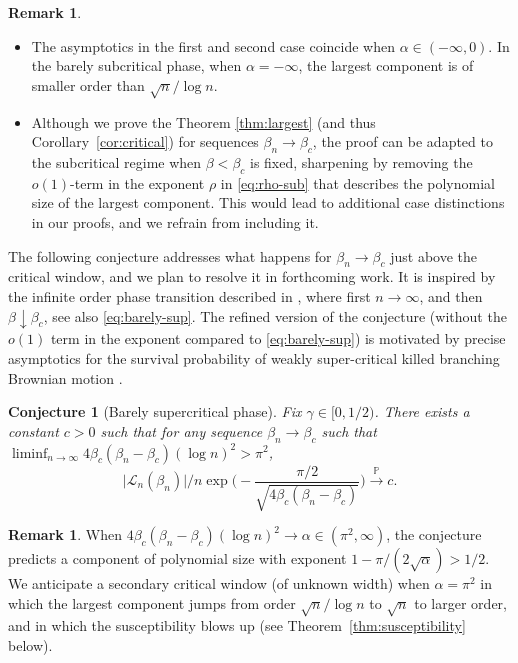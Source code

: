\documentclass[a4paper, a4wide, 10pt, reqno]{amsart}
\theoremstyle{plain}
\newtheorem{conjecture}[theorem]{Conjecture}
\theoremstyle{definition}
\newtheorem{remark}[theorem]{Remark}
\numberwithin{equation}{section}
\newcommand{\Prob}{\mathbb{P}}
\newcommand{\sL}{{\mathscr L}}
\begin{document}
\begin{remark}\ \\[-3mm]
\begin{itemize}[leftmargin=18pt]
    \item[(i)] The asymptotics in the first and second case coincide when $\alpha\in(-\infty, 0)$. In the barely subcritical phase, when $\alpha=-\infty$, the largest component is of smaller order than $\sqrt{n}/\log n$. 
    \item[(ii)]
    Although we prove the Theorem \ref{thm:largest} (and thus Corollary~\ref{cor:critical}) for sequences $\beta_n\to\beta_c$, the proof can be adapted to the subcritical regime when $\beta<\beta_c$ is fixed, sharpening \cite{MS24} by removing the $o(1)$-term in the exponent $\rho$ in \eqref{eq:rho-sub} that describes the polynomial size of the largest component. This would lead to additional case distinctions in our proofs, and we refrain from including it.
\end{itemize}   
\label{rem:oncor}
\end{remark}





The following conjecture addresses what happens for $\beta_n\to\beta_c$ just above the critical window, and we plan to resolve it in forthcoming work. It is inspired by the infinite order phase transition  described in \cite{BJR05, EMO, Leif}, where  first $n\to\infty$, and then $\beta\downarrow \beta_c$, see also \eqref{eq:barely-sup}. The refined version of the conjecture (without the $o(1)$ term in the exponent compared to \eqref{eq:barely-sup}) is motivated by precise asymptotics for the survival probability of weakly super-critical killed branching Brownian motion \cite{Berestycki2010a}. 
\begin{conjecture}[Barely supercritical phase]
\label{conj}
Fix $\gamma\in[0,1/2)$. There exists a constant $c>0$ such that for any sequence  $\beta_n\to\beta_c$ such that $\liminf_{n\to\infty}4\beta_c(\beta_n-\beta_c)(\log n)^2> \pi^2$, 
\[
\big|\sL_n(\beta_{n})\big|\Big/ n\exp\bigg(-\frac{\pi/2}{\sqrt{4\beta_c(\beta_n-\beta_c)}}\bigg) \overset{\Prob}{\longrightarrow }c.
\]
\end{conjecture}
\begin{remark}When $4\beta_c(\beta_n-\beta_c)(\log n)^2\to\alpha\in(\pi^2,\infty)$, the conjecture predicts a component of polynomial size with exponent $1-\pi/(2\sqrt{\alpha})>1/2$. 
We anticipate a secondary critical window (of unknown width) when $\alpha=\pi^2$ in which the largest component jumps from order $\sqrt{n}/\log n$
to $\sqrt{n}$ to larger order, and in which the susceptibility blows up (see Theorem~\ref{thm:susceptibility} below).
\end{remark}
\end{document}

